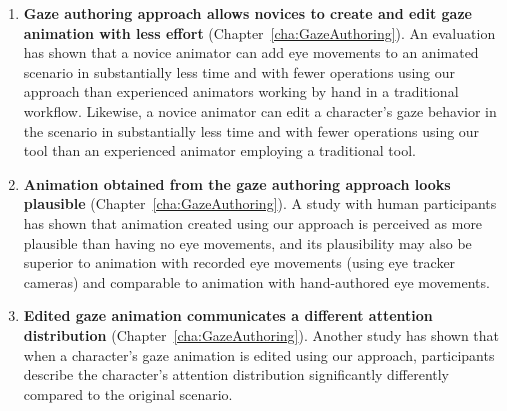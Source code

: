 \begin{enumerate}
\item \textbf{Gaze authoring approach allows novices to create and edit gaze animation with less effort} (Chapter~\ref{cha:GazeAuthoring}). An evaluation has shown that a novice animator can add eye movements to an animated scenario in substantially less time and with fewer operations using our approach than experienced animators working by hand in a traditional workflow. Likewise, a novice animator can edit a character's gaze behavior in the scenario in substantially less time and with fewer operations using our tool than an experienced animator employing a traditional tool.
\item \textbf{Animation obtained from the gaze authoring approach looks plausible} (Chapter~\ref{cha:GazeAuthoring}). A study with human participants has shown that animation created using our approach is perceived as more plausible than having no eye movements, and its plausibility may also be superior to animation with recorded eye movements (using eye tracker cameras) and comparable to animation with hand-authored eye movements.
\item \textbf{Edited gaze animation communicates a different attention distribution} (Chapter~\ref{cha:GazeAuthoring}). Another study has shown that when a character's gaze animation is edited using our approach, participants describe the character's attention distribution significantly differently compared to the original scenario.
\end{enumerate}

